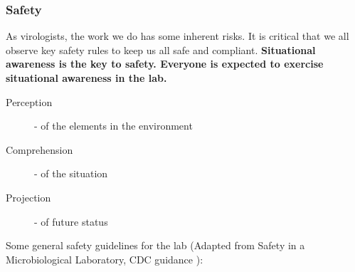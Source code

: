 \documentclass[10pt, a4paper, twocolumn]{article} %
\begin{document}
\subsubsection{Safety}
As virologists, the work we do has some inherent risks. It is critical that we all observe key safety rules to keep us all safe and compliant.\newline \newline
\bfseries{Situational awareness} is the key to safety. Everyone is expected to exercise situational awareness in the lab.

\begin{description}
\item [Perception] - of the elements in the environment
\item [Comprehension] - of the situation
\item [Projection] - of future status
\end{description}
Some general safety guidelines for the lab (Adapted from Safety in a Microbiological Laboratory, CDC guidance \citep{US_Department_of_Health_and_Human_Services2020-ck}):
\end{document}
